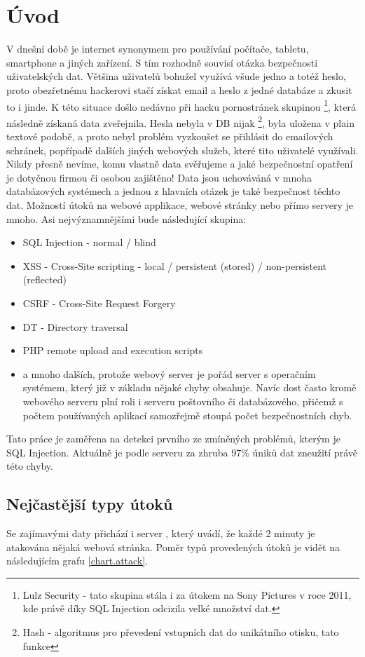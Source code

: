 \documentclass[12pt, a4paper]{report}
\begin{document}
\chapter{Úvod}
V dnešní době je internet synonymem pro používání počítače, tabletu, smartphone a jiných zařízení. S tím rozhodně souvisí otázka bezpečnosti uživatelských dat. Většina uživatelů bohužel využívá všude jedno a totéž heslo, proto obezřetnému hackerovi stačí získat email a heslo z jedné databáze a zkusit to i jinde. K této situace došlo nedávno při hacku pornostránek skupinou \footnote{Lulz Security - tato skupina stála i za útokem na Sony Pictures v roce 2011, kde právě díky SQL Injection odcizila velké množství dat.}, která následně získaná data zveřejnila. Hesla nebyla v DB nijak \footnote{Hash - algoritmus pro převedení vstupních dat do unikátního otisku, tato funkce }, byla uložena v plain textové podobě, a proto nebyl problém vyzkoušet se přihlásit do emailových schránek, popřípadě dalších jiných webových služeb, které tito uživatelé využívali. Nikdy přesně nevíme, komu vlastně data svěřujeme a jaké bezpečnostní opatření je dotyčnou firmou či osobou zajištěno! Data jsou uchováváná v mnoha databázových systémech a jednou z hlavních otázek je také bezpečnost těchto dat. Možností útoků na webové applikace, webové stránky nebo přímo servery je mnoho.  Asi nejvýznamnějšími bude následující skupina:
\begin{itemize}
\item SQL Injection - normal / blind
\item XSS - Cross-Site scripting - local / persistent (stored) / non-persistent (reflected)
\item CSRF - Cross-Site Request Forgery 
\item DT - Directory traversal
\item PHP remote upload and execution scripts
\item a mnoho dalších, protože webový server je pořád server s operačním systémem, který již v základu nějaké chyby obsahuje. Navíc dost často kromě webového serveru plní roli i serveru poštovního či databázového, přičemž s počtem používaných aplikací samozřejmě stoupá počet bezpečnostních chyb.
\end{itemize}
Tato práce je zaměřena na detekci prvního ze zmíněných problémů, kterým je SQL Injection. Aktuálně je podle serveru  za zhruba 97\% úniků dat zneužití právě této chyby. 

\section{Nejčastější typy útoků}
Se zajímavými daty přichází i server , který uvádí, že každé 2 minuty je atakována nějaká webová stránka. Poměr typů provedených útoků je vidět na následujícím grafu \ref{chart.attack}.
\end{document}
